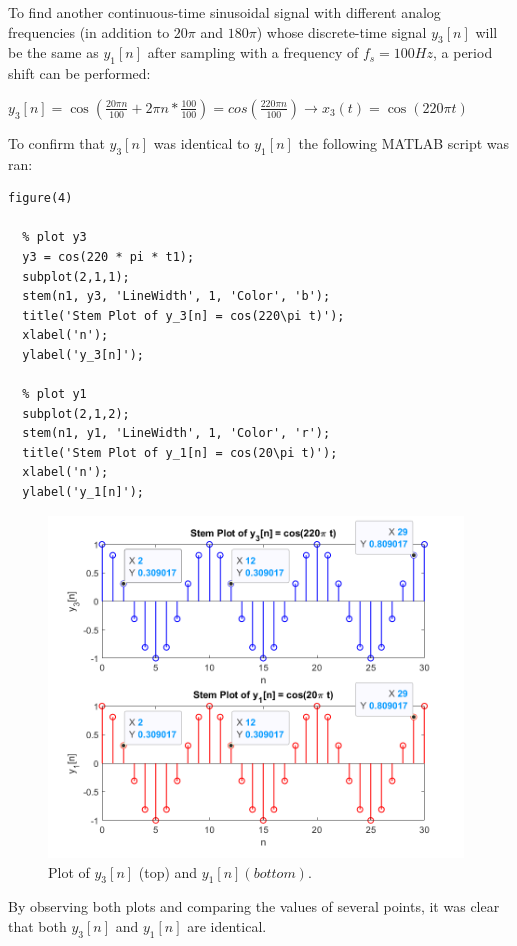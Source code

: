 \documentclass[a4paper, 10pt]{article}
\begin{document}
\noindent To find another continuous-time sinusoidal signal with different analog frequencies (in addition to $20\pi$ and $180\pi$)
whose discrete-time signal $y_3[n]$ will be the same as $y_1[n]$ after sampling with a frequency of $f_s = 100Hz$, a 
period shift can be performed:
\begin{center}
  $y_3[n] = \cos(\frac{20\pi n}{100} + 2\pi n * \frac{100}{100}) = cos(\frac{220\pi n}{100}) \rightarrow x_3(t) = \cos(220\pi t)$
\end{center}
To confirm that $y_3[n]$ was identical to $y_1[n]$ the following MATLAB script was ran:
\begin{lstlisting}[style=Matlab-editor, basicstyle=\small\ttfamily]
  figure(4)

  % plot y3
  y3 = cos(220 * pi * t1);
  subplot(2,1,1);
  stem(n1, y3, 'LineWidth', 1, 'Color', 'b');
  title('Stem Plot of y_3[n] = cos(220\pi t)');
  xlabel('n');
  ylabel('y_3[n]');
  
  % plot y1
  subplot(2,1,2);
  stem(n1, y1, 'LineWidth', 1, 'Color', 'r');
  title('Stem Plot of y_1[n] = cos(20\pi t)');
  xlabel('n');
  ylabel('y_1[n]');
\end{lstlisting}
\begin{figure}[H]
  \centering
  \includegraphics[width=11cm]{images/q3_c.png}
  \caption{Plot of $y_3[n]$ (top) and $y_1[n] (bottom).$}
\end{figure}
By observing both plots and comparing the values of several points, it was clear that both $y_3[n]$ and $y_1[n]$ are 
identical.

\end{document}
